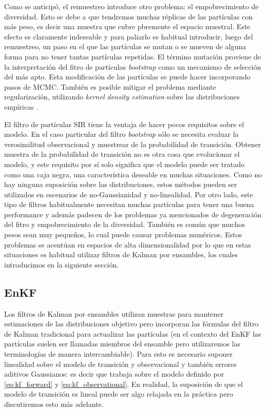 Como se anticipó, el remuestreo introduce otro problema: el empobrecimiento de diversidad. Esto se debe a que tendremos muchas réplicas de las partículas con más peso, es decir una muestra que cubre pbremente el espacio muestral. Este efecto es claramente indeseable y para paliarlo es habitual introducir, luego del remuestreo, un paso en el que las partículas se mutan o se mueven de alguna forma para no tener tantas partículas repetidas. El término mutación proviene de la interpretación del fitro de partículas \textit{bootstrap} como un mecanismo de selección del más apto. Esta modificación de las partículas se puede hacer incorporando pasos de MCMC. También es posible mitigar el problema mediante regularización, utilizando \textit{kernel density estimation} sobre las distribuciones empíricas \citep{Sarkka2013, Arulampalam2002, Ruchi2019}.

El filtro de partículas SIR tiene la ventaja de hacer pocos requisitos sobre el modelo. En el caso particular del filtro \textit{bootstrap} sólo se necesita evaluar la verosimilitud observacional y muestrear de la probabilidad de transición. Obtener muestra de la probabilidad de transición no es otra cosa que evolucionar el modelo, y este requisito por sí solo significa que el modelo puede ser tratado como una caja negra, una característica deseable en muchas situaciones. Como no hay ninguna suposición sobre las distribuciones, estos métodos pueden ser utilizados en escenarios de no-Gaussianidad y no-linealidad. Por otro lado, este tipo de filtros habitualmente necesitan muchas partículas para tener una buena performance y además padecen de los problemas ya mencionados de degeneración del fitro y empobrecimiento de la diversidad. También es común que muchos pesos sean muy pequeños, lo cual puede causar problemas numéricos. Estos problemas se acentúan en espacios de alta dimensionalidad por lo que en estas situaciones es habitual utilizar filtros de Kalman por ensambles, los cuales introducimos en la siguiente sección.

\subsection{EnKF}

Los filtros de Kalman por ensambles utilizan muestras para mantener estimaciones de las distribuciones objetivo pero incorporan las fórmulas del filtro de Kalman tradicional para actualizar las partículas (en el contexto del EnKF las partículas suelen ser llamadas miembros del ensamble pero utilizaremos las terminologías de manera intercambiable). Para esto es necesario suponer linealidad sobre el modelo de transición y observacional y también errores aditivos Gaussianos: es decir que trabaja sobre el modelo definido por \ref{eq:kf_forward} y \ref{eq:kf_observational}. En realidad, la suposición de que el modelo de transición es lineal puede ser algo relajada en la práctica pero discutiremos esto más adelante.


